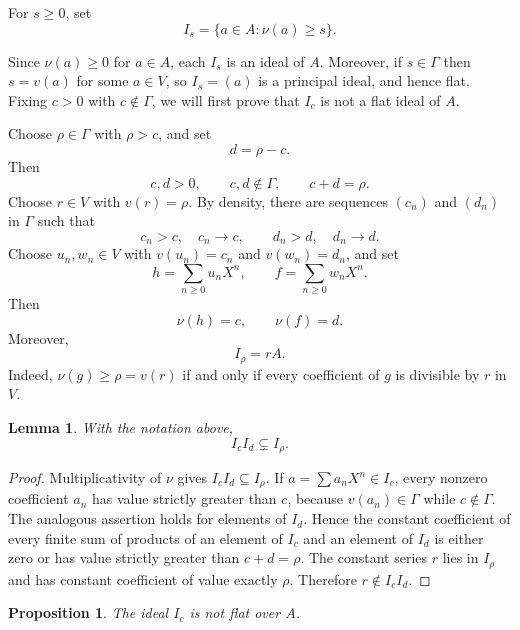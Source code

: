 \documentclass[12pt]{amsart}
\newtheorem{proposition}[theorem]{Proposition}
\newtheorem{lemma}[theorem]{Lemma}
\theoremstyle{plain}
\begin{document}
\noindent For $s\geq0$, set
\[
  I_s=\{a\in A:\nu(a)\geq s\}.
\]

Since $\nu(a)\geq0$ for $a\in A$, each $I_s$ is an ideal of $A$. Moreover, if $s\in \Gamma$ then $s=v(a)$ for some $a\in V$, so $I_s=(a)$ is a principal ideal, and hence flat. Fixing $c>0$ with $c\notin\Gamma$, we will first prove that $I_c$ is not a flat ideal of $A$.

Choose $\rho\in\Gamma$ with $\rho>c$, and set
\[
  d=\rho-c.
\]
Then
\begin{equation}\label{eq:cuts}
  c,d>0,
  \qquad c,d\notin\Gamma,
  \qquad c+d=\rho.
\end{equation}
Choose $r\in V$ with $v(r)=\rho$. By density, there are sequences
$(c_n)$ and $(d_n)$ in $\Gamma$ such that
\[
  c_n>c,\quad c_n\longrightarrow c,
  \qquad
  d_n>d,\quad d_n\longrightarrow d.
\]
Choose $u_n,w_n\in V$ with $v(u_n)=c_n$ and $v(w_n)=d_n$, and set
\begin{equation}\label{eq:hf}
  h=\sum_{n\geq0}u_nX^n,
  \qquad
  f=\sum_{n\geq0}w_nX^n.
\end{equation}
Then
\begin{equation}\label{eq:hf-values}
  \nu(h)=c,
  \qquad
  \nu(f)=d.
\end{equation}
Moreover,
\begin{equation}\label{eq:Irho}
  I_\rho=rA.
\end{equation}
Indeed, $\nu(g)\geq\rho=v(r)$ if and only if every coefficient of $g$
is divisible by $r$ in $V$.

\begin{lemma}\label{lem:strict-product}
With the notation above,
\[
  I_cI_d\subsetneq I_\rho.
\]
\end{lemma}

\begin{proof}
Multiplicativity of $\nu$ gives $I_cI_d\subseteq I_\rho$. If
$a=\sum a_nX^n\in I_c$, every nonzero coefficient $a_n$ has value
strictly greater than $c$, because $v(a_n)\in\Gamma$ while
$c\notin\Gamma$. The analogous assertion holds for elements of $I_d$. Hence the constant coefficient of every finite sum of products of an
element of $I_c$ and an element of $I_d$ is either zero or has value
strictly greater than $c+d=\rho$. The constant series $r$ lies in
$I_\rho$ and has constant coefficient of value exactly $\rho$.
Therefore $r\notin I_cI_d$.
\end{proof}

\begin{proposition}\label{prop:cut-not-flat}
The ideal $I_c$ is not flat over $A$.
\end{proposition}
\end{document}
